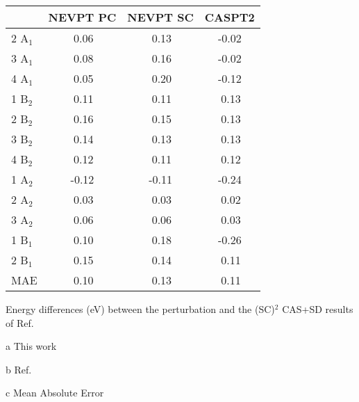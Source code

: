 \begin{center}
\begin{threeparttable}
\footnotesize
\begin{tabular*}{0.80\textwidth}{l@{\hspace*{15mm}}ccc}
\hline
         & NEVPT PC\tnote{a}& NEVPT SC\tnote{a} & CASPT2\tnote{b}    \\
\hline
2 A$_1$  & $~$0.06 & $~$0.13  &    -0.02  \\
3 A$_1$  & $~$0.08 & $~$0.16  &    -0.02  \\
4 A$_1$  & $~$0.05 & $~$0.20  &    -0.12  \\
1 B$_2$  & $~$0.11 & $~$0.11  &  $~$0.13  \\
2 B$_2$  & $~$0.16 & $~$0.15  &  $~$0.13  \\
3 B$_2$  & $~$0.14 & $~$0.13  &  $~$0.13  \\
4 B$_2$  & $~$0.12 & $~$0.11  &  $~$0.12  \\
1 A$_2$  &   -0.12 &   -0.11  &    -0.24  \\
2 A$_2$  & $~$0.03 & $~$0.03  &  $~$0.02  \\
3 A$_2$  & $~$0.06 & $~$0.06  &  $~$0.03  \\
1 B$_1$  & $~$0.10 & $~$0.18  &    -0.26  \\
2 B$_1$  & $~$0.15 & $~$0.14  &  $~$0.11  \\
\hline
MAE\tnote{c}   & $~$0.10 & $~$0.13  &  $~$0.11  \\
\hline
\end{tabular*}
\caption{\footnotesize 
Energy differences (eV) between the perturbation and the (SC)$^2$ CAS+SD
results of Ref. 
}
\label{tbl:form_comparison_1}
\begin{tablenotes}
\footnotesize
\item[a] This work
\item[b] Ref. 
\item[c] Mean Absolute Error
\end{tablenotes}
\end{threeparttable}
\end{center}



